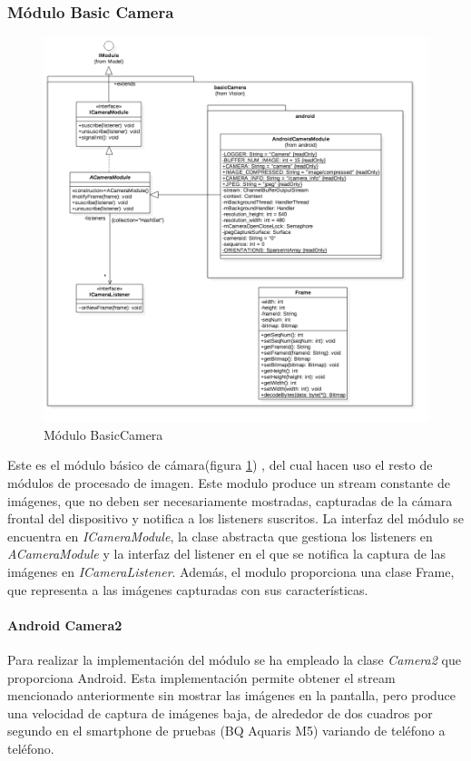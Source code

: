 \subsubsection{Módulo Basic Camera}
\begin{figure}
	\centering
	\includegraphics[width=1\linewidth]{imagenes/diagramas/BasicCameraModule.png}
	\caption{Módulo BasicCamera}
	\label{fig:basic-camera-module}
\end{figure}
Este es el módulo básico de cámara(figura \ref{fig:basic-camera-module}) , del cual hacen uso el resto de módulos de procesado de imagen. Este modulo produce un stream constante de imágenes, que no deben ser necesariamente mostradas, capturadas de la cámara frontal del dispositivo y notifica a los listeners suscritos.
La interfaz del módulo se encuentra en \textit{ICameraModule}, la clase abstracta que gestiona los listeners en \textit{ACameraModule} y la interfaz del listener en el que se notifica la captura de las imágenes en \textit{ICameraListener}. Además, el modulo proporciona una clase Frame, que representa a las imágenes capturadas con sus características.

\paragraph*{Android Camera2\\}
Para realizar la implementación del módulo se ha empleado la clase \textit{Camera2} que proporciona Android. Esta implementación permite obtener el stream mencionado anteriormente sin mostrar las imágenes en la pantalla, pero produce una velocidad de captura de imágenes baja, de alrededor de dos cuadros por segundo en el smartphone de pruebas (BQ Aquaris M5) variando de teléfono a teléfono.


